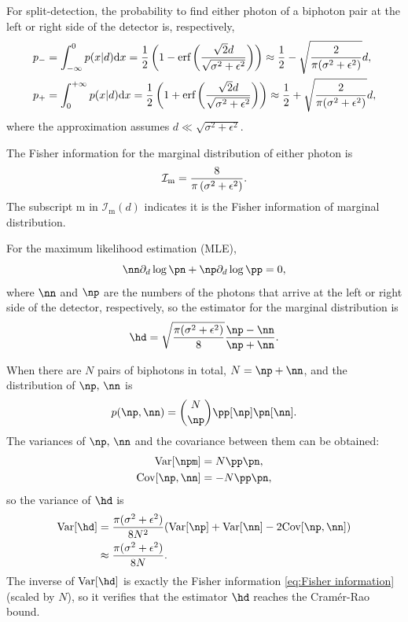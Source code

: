 For split-detection, the probability to find either photon of a biphoton pair at the
left or right side of the detector is, respectively,
\begin{equation}
\begin{aligned}p_{-} & =\int_{-\infty}^{0}p(x|d){\rm d} x=\frac{1}{2}\left(1-\text{erf}\left(\frac{\sqrt{2}d}{\sqrt{\sigma^{2}+\epsilon^{2}}}\right)\right) \approx\frac{1}{2}-\sqrt{\frac{2}{\pi(\sigma^{2}+\epsilon^{2})}}d,\\
p_{+} & =\int_{0}^{+\infty}p(x|d){\rm d} x=\frac{1}{2}\left(1+\text{erf}\left(\frac{\sqrt{2}d}{\sqrt{\sigma^{2}+\epsilon^{2}}}\right)\right)\approx\frac{1}{2}+\sqrt{\frac{2}{\pi(\sigma^{2}+\epsilon^{2})}}d,
\end{aligned}
\label{eq:2}
\end{equation}
where the approximation assumes $d\ll\sqrt{\sigma^{2}+\epsilon^{2}}$.

The Fisher information for the marginal distribution of either photon
is
\begin{equation}
\mathcal{I}_\mathrm{m}=\frac{8}{\pi\left(\sigma^{2}+\epsilon^{2}\right)}.\label{eq:Fisher information}
\end{equation}
The subscript m in $\mathcal{I}_\textrm{m}(d)$ indicates it is the Fisher information of marginal distribution.


For the maximum likelihood estimation (MLE),
\begin{equation}
\nn\pd\log\pn+\np\pd\log\pp=0,
\end{equation}
where $\nn$ and $\np$ are the numbers of the photons that arrive at the left or right side of the detector, respectively, so the estimator for the marginal distribution is
\begin{equation}
\hd=\sqrt{\frac{\pi(\sigma^{2}+\epsilon^{2})}{8}}\frac{\np-\nn}{\np+\nn}.
\end{equation}


When there are $N$ pairs of biphotons in total, $N=\np+\nn$,
and the distribution of $\np,\,\nn$ is
\begin{equation}
p(\np,\nn)=\binom{N}{\np}\pp[\np]\pn[\nn].
\end{equation}
The variances of $\np,\,\nn$ and the covariance between them can be obtained:
\begin{equation}
\begin{aligned}\var{\npm} & =N\pp\pn,\\
\cov{\np,\nn} & =-N\pp\pn,
\end{aligned}
\end{equation}
so the variance of $\hd$ is
\begin{equation}
\begin{aligned}\var{\hd} & =\frac{\pi(\sigma^{2}+\epsilon^{2})}{8N^{2}}(\var{\np}+\var{\nn}-2\cov{\np,\nn})\\
 & \approx\frac{\pi(\sigma^{2}+\epsilon^{2})}{8N}.
\end{aligned}
\end{equation}
The inverse of $\var{\hd}$ is exactly the Fisher information \eqref{eq:Fisher information}
(scaled by $N$), so it verifies that the estimator $\hd$ reaches
the Cram\'er-Rao bound.

